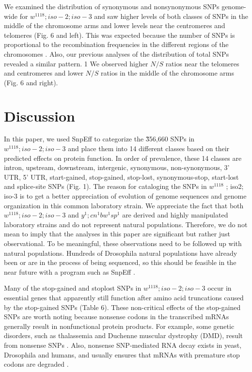 We examined the distribution of synonymous and nonsynonymous SNPs genome-wide for $w^{1118} ; iso-2; iso-3$ and saw higher levels of both classes of SNPs in the middle of the chromosome arms and lower levels near the centromeres and telomeres (Fig.  6 and left). This was expected because the number of SNPs is proportional to the recombination frequencies in the different regions of the chromosomes \cite{begun1992levels,charlesworth1987relative}. Also, our previous analyses of the distribution of total SNPs revealed a similar pattern. 1 We observed higher $N/S$ ratios near the telomeres and centromeres and lower $N/S$ ratios in the middle of the chromosome arms (Fig.  6 and right).

\section{Discussion}

In this paper, we used SnpEff to categorize the \~356,660 SNPs in $w^{1118} ; iso-2; iso-3$ and place them into 14 different classes based on their predicted effects on protein function. In order of prevalence, these 14 classes are intron, upstream, downstream, intergenic, synonymous, non-synonymous, 3' UTR, 5' UTR, start-gained, stop-gained, stop-lost, synonymous-stop, start-lost and splice-site SNPs (Fig. 1). The reason for cataloging the SNPs in $w^{1118}$ ; iso2; iso-3 is to get a better appreciation of evolution of genome sequences and genome organization in this common laboratory strain. We appreciate the fact that both $w^{1118} ; iso-2; iso-3$ and $y^1 ; cn^1 bw^1 sp^1$ are derived and highly manipulated laboratory strains and do not represent natural populations. Therefore, we do not mean to imply that the analyses in this paper are significant but rather just observational. To be meaningful, these observations need to be followed up with natural populations. Hundreds of Drosophila natural populations have already been or are in the process of being sequenced, so this should be feasible in the near future with a program such as SnpEff \cite{anderson2009molecular}.

Many of the stop-gained and stoplost SNPs in $w^{1118} ; iso-2; iso-3$ occur in essential genes that apparently still function after amino acid truncations caused by the stop-gained SNPs (Table 6). These non-critical effects of the stop-gained SNPs are worth noting because nonsense codons in the transcribed mRNAs generally result in nonfunctional protein products. For example, some genetic disorders, such as thalassemia and Duchenne muscular dystrophy (DMD), result from nonsense SNPs \cite{flanigan2009dmd,tran2007nonsense,chang1979beta}. Also, nonsense SNP-mediated RNA decay exists in yeast, Drosophila and humans, and usually ensures that mRNAs with premature stop codons are degraded \cite{gatfield2003nonsense}.

